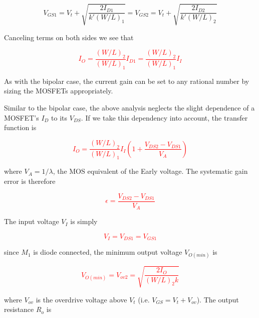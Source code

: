 \begin{equation}
V_{GS1} = V_{t} + \sqrt{\frac{2I_{D1}}{k'(W/L)_{1}}} = V_{GS2} = V_{t} + \sqrt{\frac{2I_{D2}}{k'(W/L)_{2}}}
\end{equation}

Canceling terms on both sides we see that

\textcolor{red}{
\begin{equation}
I_{O} = \frac{(W/L)_{2}}{(W/L)_{1}}I_{D1} = \frac{(W/L)_{2}}{(W/L)_{1}}I_{I}
\label{eq:MOSsimplecurrentmirror}
\end{equation}
}

As with the bipolar case, the current gain can be set to any rational number by sizing the MOSFETs appropriately. \autocite[258]{analysis-design-analog-ics}

Similar to the bipolar case, the above analysis neglects the slight dependence of a MOSFET's $I_{D}$ to its $V_{DS}$.
If we take this dependency into account, the transfer function is

\textcolor{red}{
\begin{equation}
I_{O} = \frac{(W/L)_{2}}{(W/L)_{1}}I_{I}\left(1+\frac{V_{DS2}-V_{DS1}}{V_{A}}\right)
\label{eq:MOSsimplecurrentmirrorfull}
\end{equation}
}

where $V_{A} = 1/\lambda$, the MOS equivalent of the Early voltage.
The systematic gain error is therefore

\textcolor{red}{
\begin{equation}
\epsilon = \frac{V_{DS2}-V_{DS1}}{V_{A}}
\label{eq:MOSsimplecurrentmirror_sysgainerr}
\end{equation}
}

The input voltage $V_{I}$ is simply

\textcolor{red}{
\begin{equation}
V_{I} = V_{DS1} = V_{GS1}
\label{eq:MOSsimplecurrentmirror_Vi}
\end{equation}
}

since $M_1$ is diode connected, the minimum output voltage $V_{O(min)}$ is

\textcolor{red}{
\begin{equation}
V_{O(min)} = V_{ov2} = \sqrt{\frac{2I_{O}}{(W/L)_{2}k}}
\label{eq:MOSsimplecurrentmirror_Vo}
\end{equation}
}

where $V_{ov}$ is the overdrive voltage above $V_{t}$ (i.e. $V_{GS} = V_{t} + V_{ov}$).
The output resistance $R_{o}$ is \autocite[256, 259]{analysis-design-analog-ics}

